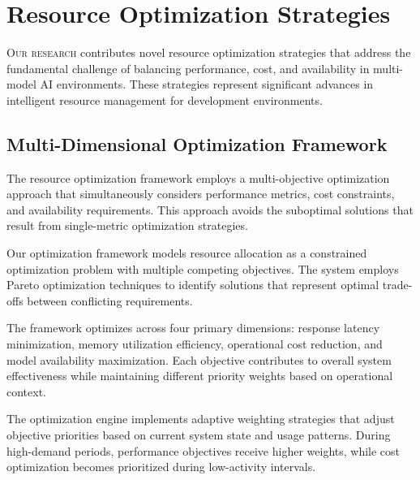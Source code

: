 
\section*{Resource Optimization Strategies}

\vspace{0.5cm}
\lettrine{O}{ur research} contributes novel resource optimization strategies that address the fundamental challenge of balancing performance, cost, and availability in multi-model AI environments. These strategies represent significant advances in intelligent resource management for development environments.

\subsection*{Multi-Dimensional Optimization Framework}

The resource optimization framework employs a multi-objective optimization approach that simultaneously considers performance metrics, cost constraints, and availability requirements. This approach avoids the suboptimal solutions that result from single-metric optimization strategies.

Our optimization framework models resource allocation as a constrained optimization problem with multiple competing objectives. The system employs Pareto optimization techniques to identify solutions that represent optimal trade-offs between conflicting requirements.

\begin{infobox}[title=Optimization Objectives]
The framework optimizes across four primary dimensions: response latency minimization, memory utilization efficiency, operational cost reduction, and model availability maximization. Each objective contributes to overall system effectiveness while maintaining different priority weights based on operational context.
\end{infobox}

The optimization engine implements adaptive weighting strategies that adjust objective priorities based on current system state and usage patterns. During high-demand periods, performance objectives receive higher weights, while cost optimization becomes prioritized during low-activity intervals.


